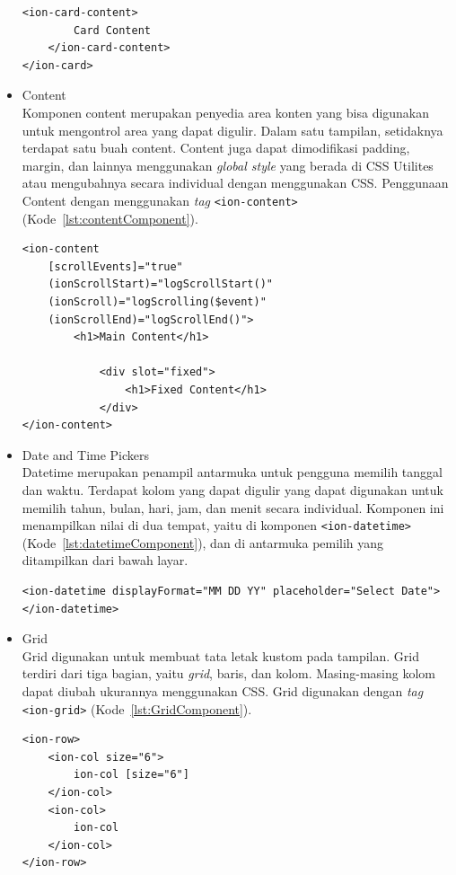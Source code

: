 \begin{itemize}
\begin{lstlisting}[label={lst:cardComponent}, caption=Potongan Kode Program dari Card Component]
	<ion-card-content>
		Card Content
	</ion-card-content>
</ion-card>
\end{lstlisting} 
	
	\item Content\\
	Komponen content merupakan penyedia area konten yang bisa digunakan untuk mengontrol area yang dapat digulir. Dalam satu tampilan, setidaknya terdapat satu buah content. Content juga dapat dimodifikasi padding, margin, dan lainnya menggunakan {\it global style} yang berada di CSS Utilites atau mengubahnya secara individual dengan menggunakan CSS. Penggunaan Content dengan menggunakan {\it tag} \texttt{<ion-content>} (Kode~\ref{lst:contentComponent}).

\begin{lstlisting}[label={lst:contentComponent}, caption=Potongan Kode Program dari Content Component]
<ion-content
	[scrollEvents]="true"
	(ionScrollStart)="logScrollStart()"
	(ionScroll)="logScrolling($event)"
	(ionScrollEnd)="logScrollEnd()">
		<h1>Main Content</h1>
			
			<div slot="fixed">
				<h1>Fixed Content</h1>
			</div>
</ion-content>
\end{lstlisting} 

	\item Date and Time Pickers\\
	Datetime merupakan penampil antarmuka untuk pengguna memilih tanggal dan waktu. Terdapat kolom yang dapat digulir yang dapat digunakan untuk memilih tahun, bulan, hari, jam, dan menit secara individual. Komponen ini menampilkan nilai di dua tempat, yaitu di komponen \texttt{<ion-datetime>} (Kode~\ref{lst:datetimeComponent}), dan di antarmuka pemilih yang ditampilkan dari bawah layar.
\begin{lstlisting}[label={lst:datetimeComponent}, caption=Kode Program dari Datetime Component dengan Format Bulan-Hari-Tahun]
<ion-datetime displayFormat="MM DD YY" placeholder="Select Date"></ion-datetime>
\end{lstlisting} 

	\item Grid \\
	Grid digunakan untuk membuat tata letak kustom pada tampilan. Grid terdiri dari tiga bagian, yaitu \textit{grid}, baris, dan kolom. Masing-masing kolom dapat diubah ukurannya menggunakan CSS. Grid digunakan dengan \textit{tag} \texttt{<ion-grid>} (Kode~\ref{lst:GridComponent}).	
	\newpage	
\begin{lstlisting}[label={lst:GridComponent}, caption=Potongan Kode Program dari Grid Component]
<ion-row>
	<ion-col size="6">
    	ion-col [size="6"]
    </ion-col>
    <ion-col>
      	ion-col
    </ion-col>
</ion-row>
\end{lstlisting}
	

\end{itemize}
